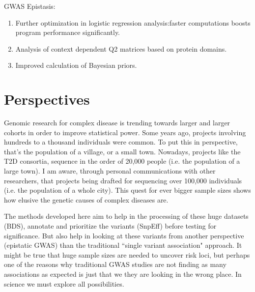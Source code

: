 GWAS Epistasis:
\begin{enumerate}
\item Further optimization in logistic regression analysis:faster computations boosts program performance significantly.
\item Analysis of context dependent Q2 matrices based on protein domains.
\item Improved calculation of Bayesian priors.
\end{enumerate}

\section{Perspectives}

Genomic research for complex disease is trending towards larger and larger cohorts in order to improve statistical power. Some years ago, projects involving hundreds to a thousand individuals were common. To put this in perspective, that’s the population of a village, or a small town. Nowadays, projects like the T2D consortia, sequence in the order of 20,000 people (i.e. the population of a large town). I am aware, through personal communications with other researchers, that projects being drafted for sequencing over 100,000 individuals (i.e. the population of a whole city). This quest for ever bigger sample sizes shows how elusive the genetic causes of complex diseases are. 

The methods developed here aim to help in the processing of these huge datasets (BDS), annotate and prioritize the variants (SnpEff) before testing for significance. But also help in looking at these variants from another perspective (epistatic GWAS) than the traditional ``single variant association" approach. It might be true that huge sample sizes are needed to uncover risk loci, but perhaps one of the reasons why traditional GWAS studies are not finding as many associations as expected is just that we they are looking in the wrong place. In science we must explore all possibilities.


